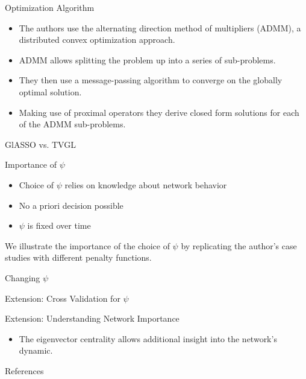 \documentclass{beamer}
\begin{document}
\begin{frame}{Optimization Algorithm}
    \begin{itemize}
        \item The authors use the alternating direction method of multipliers (ADMM), a distributed convex optimization approach.
        \item ADMM allows splitting the problem up into a series of sub-problems.
        \item They then use a message-passing algorithm to converge on the globally optimal solution.
        \item Making use of proximal operators they derive closed form solutions for each of the ADMM sub-problems.
    \end{itemize}
\end{frame}

\begin{frame}{GlASSO vs. TVGL}
  


\end{frame}


\begin{frame}{Importance of $\psi$}
    \begin{itemize}
        \item Choice of $\psi$ relies on knowledge about network behavior
        \item No a priori decision possible
        \item $\psi$ is fixed over time
    \end{itemize}
    We illustrate the importance of the choice of $\psi$ by replicating the author's case studies with different
    penalty functions.
\end{frame}

\begin{frame}{Changing $\psi$}

\end{frame}

\begin{frame}{Extension: Cross Validation for $\psi$}

\end{frame}

\begin{frame}{Extension: Understanding Network Importance}
    \begin{itemize}
        \item The eigenvector centrality allows additional insight into the network's dynamic.
    \end{itemize}
\end{frame}

\begin{frame}{References}
    \nocite{*}
    
    
\end{frame}
\end{document}

